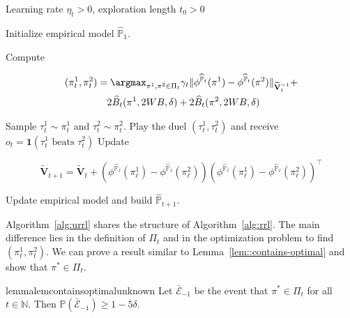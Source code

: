 \begin{algorithm}[H]
   \caption{\textbf{LPbRL: Regret minimization (Unknown Model)}}
   \label{alg:urrl}
\begin{algorithmic}[1]
   Learning rate $\eta_t >0$, exploration length $t_0>0$

  \STATE Initialize empirical model $\widehat{\mathbb{P}}_1$.

    \STATE Compute 

    \begin{align*}
        (\pi_t^1, \pi_t^2) &= \argmax_{  \pi^1, \pi^2 \in \Pi_t} \gamma_t \| \phi^{\widehat{\mathbb{P}}_t}(\pi^1) - \phi^{\widehat{\mathbb{P}}_t}(\pi^2) \|_{\widetilde{\mathbf{V}}_t^{-1}} + \\
        &\quad 2\widehat{B}_t(\pi^1, 2WB, \delta)  + 2 \widehat{B}_t(\pi^2, 2WB, \delta)
    \end{align*}

    \STATE Sample $\tau_t^1 \sim \pi_t^1$ and $\tau_t^2 \sim \pi_t^2$.
    \STATE Play the duel $(\tau_t^1,\tau_t^2)$ and receive $o_t = {\mathbf 1}(\tau_t^1 \text{ beats } \tau_t^2)$
    \STATE Update 

    \begin{small}
    $$\widetilde{\mathbf{V}}_{t+1} = \widetilde{\mathbf{V}}_{t} + \left( \phi^{\widehat{\mathbb{P}}_\ell}(\pi_\ell^1) - \phi^{\widehat{\mathbb{P}}_\ell}(\pi_\ell^2)  \right)\left( \phi^{\widehat{\mathbb{P}}_\ell}(\pi_\ell^1) - \phi^{\widehat{\mathbb{P}}_\ell}(\pi_\ell^2) \right)^\top  $$
    \end{small}
  \STATE Update empirical model and build $\widehat{\mathbb{P}}_{t+1}$.
  \ENDFOR

\end{algorithmic}
\end{algorithm}

Algorithm~\ref{alg:urrl} shares the structure of Algorithm~\ref{alg:rrl}. The main difference lies in the definition of $\Pi_t$ and in the optimization problem to find $(\pi_t^1, \pi_t^2)$. We can prove a result similar to Lemma~\ref{lem::contains-optimal} and show that $\pi^* \in \Pi_t$.

\begin{restatable}{lemma}{lemcontainsoptimalunknown}\label{lem::contains-optimal_unknown}
Let $\bar{\mathcal{E}}_{-1}$ be the event that $\pi^* \in \Pi_t$ for all $t \in \mathbb{N}$. Then $\mathbb{P}\left( \bar{\mathcal{E}}_{-1} \right) \geq 1-5\delta$.

\end{restatable}

